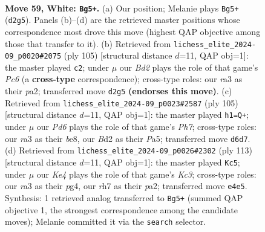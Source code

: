 \documentclass[11pt]{article}
\begin{document}
\clearpage

\begin{figure}[p]\centering
\begin{subfigure}{0.46\textwidth}\centering
\resizebox{\linewidth}{!}{%
\newchessgame
\chessboard[
  setfen={3k4/7r/3P4/1p6/4K3/r7/1p1B4/8 w - - 0 59},
  showmover=false,
  pgfstyle=straightmove, color=movearrow, markmove={d2-g5}
]}
\caption{}
\end{subfigure}\hfill
\begin{subfigure}{0.46\textwidth}\centering
\resizebox{\linewidth}{!}{%
\newchessgame
\chessboard[
  setfen={8/p3k3/8/1p1K4/7R/2p5/P7/8 b - - 0 53},
  showmover=false,
  pgfstyle=straightmove, color=movearrow, markmove={c3-c2}
]}
\caption{}
\end{subfigure}
\\[4pt]
\begin{subfigure}{0.46\textwidth}\centering
\resizebox{\linewidth}{!}{%
\newchessgame
\chessboard[
  setfen={4B3/8/7k/p2K4/8/8/P6p/2R5 b - - 1 53},
  showmover=false,
  pgfstyle=straightmove, color=movearrow, markmove={h2-h1}
]}
\caption{}
\end{subfigure}\hfill
\begin{subfigure}{0.46\textwidth}\centering
\resizebox{\linewidth}{!}{%
\newchessgame
\chessboard[
  setfen={8/6b1/p1k5/8/2p2PP1/8/P1K5/8 b - - 0 57},
  showmover=false,
  pgfstyle=straightmove, color=movearrow, markmove={c6-c5}
]}
\caption{}
\end{subfigure}
\caption{\textbf{Move 59, White: \texttt{Bg5+}.} (a) Our position; Melanie plays \texttt{Bg5+} (\texttt{d2g5}). Panels (b)--(d) are the retrieved master positions whose correspondence most drove this move (highest QAP objective among those that transfer to it). (b) Retrieved from \texttt{lichess\_elite\_2024-09\_p0020\#2075} (ply 105) [structural distance $d$=11, QAP obj=1]: the master played \texttt{c2}; under $\mu$ our \emph{Bd2} plays the role of that game's \emph{Pc6} (a \textbf{cross-type} correspondence); cross-type roles: our \emph{r}a3 as their \emph{p}a2; transferred move \texttt{d2g5} \textbf{(endorses this move)}. (c) Retrieved from \texttt{lichess\_elite\_2024-09\_p0023\#2587} (ply 105) [structural distance $d$=11, QAP obj=1]: the master played \texttt{h1=Q+}; under $\mu$ our \emph{Pd6} plays the role of that game's \emph{Ph7}; cross-type roles: our \emph{r}a3 as their \emph{b}e8, our \emph{B}d2 as their \emph{P}a5; transferred move \texttt{d6d7}. (d) Retrieved from \texttt{lichess\_elite\_2024-09\_p0026\#2302} (ply 113) [structural distance $d$=11, QAP obj=1]: the master played \texttt{Kc5}; under $\mu$ our \emph{Ke4} plays the role of that game's \emph{Kc3}; cross-type roles: our \emph{r}a3 as their \emph{p}g4, our \emph{r}h7 as their \emph{p}a2; transferred move \texttt{e4e5}. Synthesis: 1 retrieved analog transferred to \texttt{Bg5+} (summed QAP objective 1, the strongest correspondence among the candidate moves); Melanie committed it via the \texttt{search} selector.}
\label{fig:thought-m116}
\end{figure}
\end{document}
